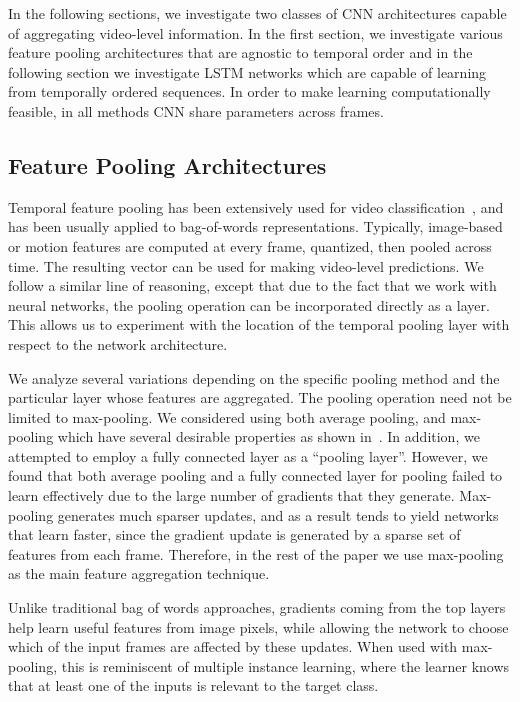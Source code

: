 \documentclass[10pt,twocolumn,letterpaper]{article}
\begin{document}
In the following sections, we investigate two classes of CNN architectures
capable of aggregating video-level information. In the first section, we
investigate various feature pooling architectures that are agnostic to temporal
order and in the following section we investigate LSTM networks which are capable of
learning from temporally ordered sequences. In order to make learning computationally feasible,
in all methods CNN share parameters across frames.

\vspace{-.6em}
\subsection{Feature Pooling Architectures}
\vspace{-.6em}
\label{subsec:maxpoolarch}
Temporal feature pooling has been extensively used for video
classification~\cite{laptev-actions,Wang09evaluationof,jain13}, and has been usually
applied to bag-of-words representations. Typically, image-based or motion
features are computed at every frame, quantized, then pooled across time.  The resulting
vector can be used for making video-level predictions. We follow a
similar line of reasoning, except that due to the fact that we work with neural
networks, the pooling operation can be incorporated directly as a layer. This allows
us to experiment with the location of the temporal pooling layer with respect
to the network architecture.

We analyze several variations depending on the specific pooling method and the
particular layer whose features are aggregated. The pooling operation need not
be limited to max-pooling. We considered using both average pooling, and max-pooling
which have several desirable properties as shown in~\cite{boureau10}. In
addition, we attempted to employ a fully connected layer as a ``pooling
layer''. However, we found that both average pooling and a fully
connected layer for pooling failed to learn effectively due to the large number
of gradients that they generate. Max-pooling generates much sparser updates,
and as a result tends to yield networks that learn faster, since the
gradient update is generated by a sparse set of features from each frame. Therefore, in the rest of the paper we use max-pooling as
the main feature aggregation technique.

Unlike traditional bag of words approaches, gradients coming from the top layers help learn useful features from image pixels, while allowing
the network to choose which of the input frames are affected by these updates. When used with max-pooling, this is reminiscent of multiple instance learning,
where the learner knows that at least one of the inputs is relevant to the target class.
\end{document}
